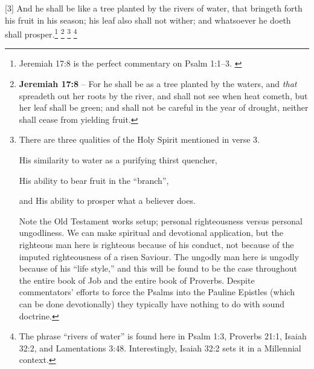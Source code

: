 [3] \textcolor[rgb]{0.00,0.00,1.00}{And he shall be like a tree planted by the rivers of water, that bringeth forth his fruit in his season; his leaf also shall not wither; and whatsoever he doeth shall prosper.}\footnote{Jeremiah 17:8 is the perfect commentary on Psalm 1:1--3. \cite{Ruckman1992Psalms}} \footnote{\textbf{Jeremiah 17:8} -- For he shall be as a tree planted by the waters, and \emph{that} spreadeth out her roots by the river, and shall not see when heat cometh, but her leaf shall be green; and shall not be careful in the year of drought, neither shall cease from yielding fruit.} \footnote{There are three qualities of the Holy Spirit mentioned in verse 3.  \cite{Ruckman1992Psalms} \begin{compactenum}
\item His similarity to water as a purifying thirst quencher, \item His ability to bear fruit in the ``branch'', 
\item and His ability to prosper what a believer does.
\end{compactenum} Note the Old Testament works setup; personal righteousness versus personal ungodliness. We can make spiritual and devotional application, but the righteous man here is righteous because of his conduct, not because of the imputed righteousness of a risen Saviour.  The ungodly man here is ungodly because of his ``life style,'' and this will be found to be the case throughout the entire book of Job and the entire book of Proverbs.  Despite commentators' efforts to force the Psalms into the Pauline Epistles (which can be done devotionally) they typically have nothing to do with sound doctrine.} \footnote{The phrase ``rivers of water'' is found here in Psalm 1:3, Proverbs 21:1, Isaiah 32:2, and Lamentations 3:48. Interestingly, Isaiah 32:2 sets it in a Millennial context.}
